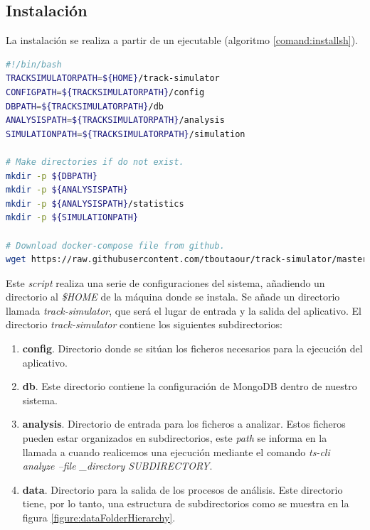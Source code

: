 \subsection{Instalación}
La instalación se realiza a partir de un ejecutable (algoritmo \ref{comand:installsh}). 
\begin{lstlisting}[caption={\textit{Script} instalador de \textit{track-simulator}}, 
language=bash, 
label={comand:installsh}] 
#!/bin/bash
TRACKSIMULATORPATH=${HOME}/track-simulator
CONFIGPATH=${TRACKSIMULATORPATH}/config
DBPATH=${TRACKSIMULATORPATH}/db
ANALYSISPATH=${TRACKSIMULATORPATH}/analysis
SIMULATIONPATH=${TRACKSIMULATORPATH}/simulation

# Make directories if do not exist.
mkdir -p ${DBPATH}
mkdir -p ${ANALYSISPATH}
mkdir -p ${ANALYSISPATH}/statistics
mkdir -p ${SIMULATIONPATH}

# Download docker-compose file from github.
wget https://raw.githubusercontent.com/tboutaour/track-simulator/master/docker-compose.yaml -O ${CONFIGPATH}/docker-compose.yaml
\end{lstlisting}
Este \textit{script} realiza una serie de configuraciones del sistema, añadiendo un 
directorio al \textit{\$HOME} de la máquina donde se instala. Se añade un directorio 
llamada \textit{track-simulator}, que será el lugar de entrada y la salida del aplicativo. El 
directorio  \textit{track-simulator} contiene los siguientes subdirectorios:
\begin{enumerate}[label={D.\arabic*.}]
\item \textbf{config}. Directorio donde se sitúan los ficheros necesarios para la 
ejecución del aplicativo.
\item \textbf{db}. Este directorio contiene la configuración de MongoDB dentro de 
nuestro sistema.
\item \textbf{analysis}. Directorio de entrada para los ficheros a analizar. Estos ficheros 
pueden estar organizados en subdirectorios, este \textit{path} se informa en la llamada 
a cuando realicemos una ejecución mediante el comando \textit{ts-cli analyze 	--file
\_directory \lbrack SUBDIRECTORY\rbrack}.
\item \textbf{data}. Directorio para la salida de los procesos de análisis. Este directorio 
tiene, por lo tanto, una estructura de subdirectorios como se muestra en la figura 
\ref{figure:dataFolderHierarchy}.

\end{enumerate}
